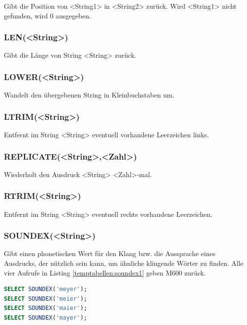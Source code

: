 \documentclass[12pt,ngerman,a4paper,index=totoc,twoside]{scrartcl}
\newcommand{\vari}[1]{\textless#1\textgreater}
\newcommand{\sql}[1]{\texttt{#1}}
\newcommand{\lwidth}{0.75}
\begin{document}
Gibt die Position von \vari{String1} in \vari{String2} zurück. Wird \vari{String1} nicht gefunden, wird 0 ausgegeben.

\subsubsection{LEN(\vari{String})}   Gibt die Länge von String \vari{String} zurück.

\subsubsection{LOWER(\vari{String})}   Wandelt den übergebenen String in Kleinbuchstaben um.

\subsubsection{LTRIM(\vari{String})}   Entfernt im String \vari{String} eventuell vorhandene Leerzeichen links.

\subsubsection{REPLICATE(\vari{String},\vari{Zahl})}  

Wiederholt den Ausdruck \vari{String} \vari{Zahl}-mal. 

\subsubsection{RTRIM(\vari{String})}   Entfernt im String \vari{String} eventuell rechts vorhandene Leerzeichen.

\subsubsection{SOUNDEX(\vari{String})}   

Gibt einen phonetischen Wert für den Klang bzw. die Aussprache eines Ausdrucks, der nützlich sein kann, um ähnliche klingende Wörter zu finden. Alle vier Aufrufe in Listing \ref{temptabellen:soundex1} geben M600 zurück.

\begin{center}
\begin{minipage}{\lwidth\textwidth}
\begin{lstlisting}[language={SQL},caption={\sql{SOUNDEX} Beispiel},label={temptabellen:soundex1}]
SELECT SOUNDEX('meyer'); 
SELECT SOUNDEX('meier');
SELECT SOUNDEX('maier');
SELECT SOUNDEX('mayer');
\end{lstlisting}
\end{minipage}
\end{center}
\end{document}
